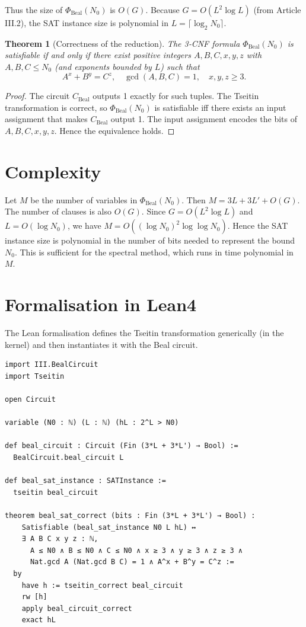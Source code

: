 \documentclass[11pt,a4paper]{article}
\newtheorem{theorem}{Theorem}[section]
\begin{document}
Thus the size of \(\Phi_{\text{Beal}}(N_0)\) is \(O(G)\). Because \(G = O(L^2 \log L)\) (from Article III.2), the SAT instance size is polynomial in \(L = \lceil \log_2 N_0\rceil\).

\begin{theorem}[Correctness of the reduction]\label{thm:correct}
The 3‑CNF formula \(\Phi_{\text{Beal}}(N_0)\) is satisfiable if and only if there exist positive integers \(A,B,C,x,y,z\) with \(A,B,C \le N_0\) (and exponents bounded by \(L\)) such that
\[
A^x + B^y = C^z,\quad \gcd(A,B,C)=1,\quad x,y,z \ge 3.
\]
\end{theorem}
\begin{proof}
The circuit \(C_{\text{Beal}}\) outputs 1 exactly for such tuples. The Tseitin transformation is correct, so \(\Phi_{\text{Beal}}(N_0)\) is satisfiable iff there exists an input assignment that makes \(C_{\text{Beal}}\) output 1. The input assignment encodes the bits of \(A,B,C,x,y,z\). Hence the equivalence holds.
\end{proof}

\section{Complexity}

Let \(M\) be the number of variables in \(\Phi_{\text{Beal}}(N_0)\). Then \(M = 3L + 3L' + O(G)\). The number of clauses is also \(O(G)\). Since \(G = O(L^2 \log L)\) and \(L = O(\log N_0)\), we have \(M = O((\log N_0)^2 \log \log N_0)\). Hence the SAT instance size is polynomial in the number of bits needed to represent the bound \(N_0\). This is sufficient for the spectral method, which runs in time polynomial in \(M\).

\section{Formalisation in Lean4}

The Lean formalisation defines the Tseitin transformation generically (in the kernel) and then instantiates it with the Beal circuit.

\begin{lstlisting}[style=lean, caption={BealSAT.lean (excerpt)}]
import III.BealCircuit
import Tseitin

open Circuit

variable (N0 : ℕ) (L : ℕ) (hL : 2^L > N0)

def beal_circuit : Circuit (Fin (3*L + 3*L') → Bool) :=
  BealCircuit.beal_circuit L

def beal_sat_instance : SATInstance :=
  tseitin beal_circuit

theorem beal_sat_correct (bits : Fin (3*L + 3*L') → Bool) :
    Satisfiable (beal_sat_instance N0 L hL) ↔
    ∃ A B C x y z : ℕ,
      A ≤ N0 ∧ B ≤ N0 ∧ C ≤ N0 ∧ x ≥ 3 ∧ y ≥ 3 ∧ z ≥ 3 ∧
      Nat.gcd A (Nat.gcd B C) = 1 ∧ A^x + B^y = C^z :=
  by
    have h := tseitin_correct beal_circuit
    rw [h]
    apply beal_circuit_correct
    exact hL
\end{lstlisting}
\end{document}
